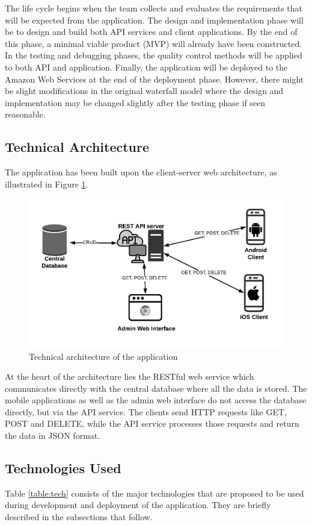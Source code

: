 \documentclass[12pt, a4paper, oneside]{article}
\begin{document}
The life cycle begins when the team collects and evaluates the requirements that will be expected from the application. The design and implementation phase will be to design and build both API services and client applications. By the end of this phase, a minimal viable product (MVP) will already have been constructed. In the testing and debugging phases, the quality control methods will be applied to both API and application. Finally, the application will be deployed to the Amazon Web Services at the end of the deployment phase. However, there might be slight modifications in the original waterfall model where the design and implementation may be changed slightly after the testing phase if seen reasonable.

\subsection{Technical Architecture}
The application has been built upon the client-server web architecture, as illustrated in Figure \ref{fig:arch}.

\begin{figure}[h]
\includegraphics[width=\linewidth]{architecture}
\centering
\caption{Technical architecture of the application}
\label{fig:arch}
\end{figure}

At the heart of the architecture lies the RESTful web service which communicates directly with the central database where all the data is stored. The mobile applications as well as the admin web interface do not access the database directly, but via the API service. The clients send HTTP requests like GET, POST and DELETE, while the API service processes those requests and return the data in JSON format.

\subsection{Technologies Used}
Table \ref{table:tech} consists of the major technologies that are proposed to be used during development and deployment of the application. They are briefly described in the subsections that follow.
\end{document}
